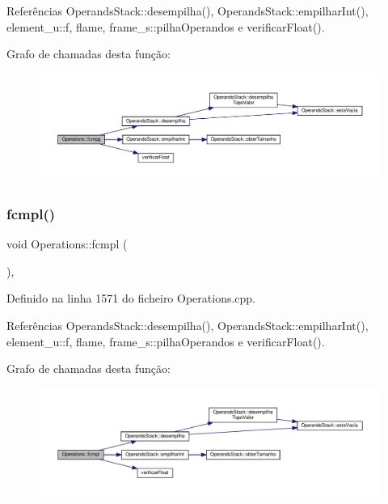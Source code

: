 Referências Operands\+Stack\+::desempilha(), Operands\+Stack\+::empilhar\+Int(), element\+\_\+u\+::f, flame, frame\+\_\+s\+::pilha\+Operandos e verificar\+Float().

Grafo de chamadas desta função\+:
\nopagebreak
\begin{figure}[H]
\begin{center}
\leavevmode
\includegraphics[width=350pt]{classOperations_a7825305c331404b97ef209a6e6d988ab_cgraph}
\end{center}
\end{figure}
\mbox{\label{classOperations_aa4a8e2be93a5cc69e40f483958014e39}} 
\subsubsection{\texorpdfstring{fcmpl()}{fcmpl()}}
{\footnotesize\ttfamily void Operations\+::fcmpl (\begin{DoxyParamCaption}{ }\end{DoxyParamCaption})\hspace{0.3cm}{\ttfamily [static]}, {\ttfamily [private]}}



Definido na linha 1571 do ficheiro Operations.\+cpp.



Referências Operands\+Stack\+::desempilha(), Operands\+Stack\+::empilhar\+Int(), element\+\_\+u\+::f, flame, frame\+\_\+s\+::pilha\+Operandos e verificar\+Float().

Grafo de chamadas desta função\+:
\nopagebreak
\begin{figure}[H]
\begin{center}
\leavevmode
\includegraphics[width=350pt]{classOperations_aa4a8e2be93a5cc69e40f483958014e39_cgraph}
\end{center}
\end{figure}
\mbox{\label{classOperations_ad3d2d82d63e7a96e144cdf014d6fb1d9}} 
